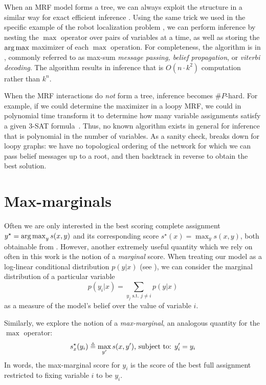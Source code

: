 When an MRF model forms a tree, we can always exploit the structure in a 
similar way for exact efficient inference \citep{koller-book}.  Using the same 
trick we used in the specific example of the robot localization problem 
, we can perform inference by nesting the $\max$ operator over 
pairs of variables at a time, as well as storing the $\mathop{\arg\max}$ maximizer of 
each $\max$ operation.  For completeness, the algorithm is in 
, commonly referred to as max-sum {\em message passing, 
belief propagation}, or {\em viterbi decoding}.  The algorithm results in 
inference that is $O(n\cdot k^2)$ computation rather than $k^n$.

When the MRF interactions do {\em not } form a tree, inference becomes 
$\#P$-hard.  For example, if we could determine the maximizer in a loopy MRF, 
we could in polynomial time transform it to determine how many variable 
assignments satisfy a given 3-SAT formula~\citep{valiant-sharpP,koller-book}.  
Thus, no known algorithm exists in general for inference that is polynomial in 
the number of variables.  As a sanity check,  breaks down 
for loopy graphs: we have no topological ordering of the network for which we 
can pass belief messages up to a root, and then backtrack in reverse to obtain 
the best solution.



\section{Max-marginals}\label{sec:max-marginals}

Often we are only interested in the best scoring complete assignment $y^\star = 
\mathop{\arg\max}_y s(x,y)$ and its corresponding score $s^\star(x) = \max_y s(x,y)$, 
both obtainable from .  However, another extremely useful 
quantity which we rely on often in this work is the notion of a {\em marginal} 
score.  When treating our model as a log-linear conditional distribution 
$p(y|x)$ (see ), we can consider the marginal distribution 
of a particular variable
\begin{equation}
p(y_i|x) = \sum_{y_j \text{ s.t. } j \neq i} p(y|x)
\end{equation}
as a measure of the model's belief over the value of variable $i$.  

Similarly, we explore the notion of a {\em max-marginal}, an analogous quantity 
for the $\max$ operator:
\begin{align}
s^\star_x(y_i) \triangleq  \max_{y'} s(x,y') \text{, subject to: } y_i' = y_i
 \end{align}
In words, the max-marginal score for $y_i$ is the score of the best full 
assignment restricted to fixing variable $i$ to be $y_i$. 

